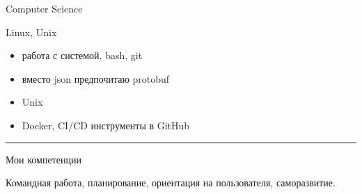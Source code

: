 \documentclass[a4paper,10pt]{article}
\newlength{\cvcolumngapwidth}
\newlength{\cvleftcolumnwidth}
\newlength{\cvrightcolumnwidth}
\newcommand{\cvsectionstyle}[1]{{\normalsize\cvsectionfont\textcolor{cvsectioncolor}{#1}}}
\newcommand{\cvheadingstyle}[1]{{\normalsize\cvheadingfont\textcolor{cvheadingcolor}{#1}}}
\newlength{\cvafteritemskipamount}
\newlength{\cvaftersectionskipamount}
\newlength{\cvbetweensectionandheadingextraskipamount}
\newlength{\cvparskip}
\newcommand{\cvsection}[1]{
    \begin{minipage}[t]{\cvleftcolumnwidth}
        \raggedleft\cvsectionstyle{#1}
    \end{minipage}%
    \hspace{\cvcolumngapwidth}%
    \begin{minipage}[t]{\cvrightcolumnwidth}
        \textcolor{cvrulecolor}{\rule{\cvrightcolumnwidth}{0.3mm}}
    \end{minipage}

    \vspace{\cvaftersectionskipamount}
}
\newcommand{\cvitem}[2]{
    \begin{minipage}[t]{\cvleftcolumnwidth}
        \raggedleft #1
    \end{minipage}%
    \hspace{\cvcolumngapwidth}%
    \begin{minipage}[t]{\cvrightcolumnwidth}
        \setlength{\parskip}{\cvparskip} #2
    \end{minipage}

    \vspace{\cvafteritemskipamount}
}
\begin{document}
\cvitem{
    \cvheadingstyle{Computer Science}
}{
    Linux, Unix
    \begin{itemize}
        \item работа с системой, bash, git
        \item вместо json предпочитаю protobuf
        \item Unix
        \item Docker, CI/CD инструменты в GitHub
    \end{itemize}
}



\cvsection{}

\vspace{\cvbetweensectionandheadingextraskipamount}

\cvitem{
    \cvheadingstyle{Мои компетенции}
}{
    Командная работа, планирование, ориентация на пользователя, саморазвитие.
}
\end{document}
